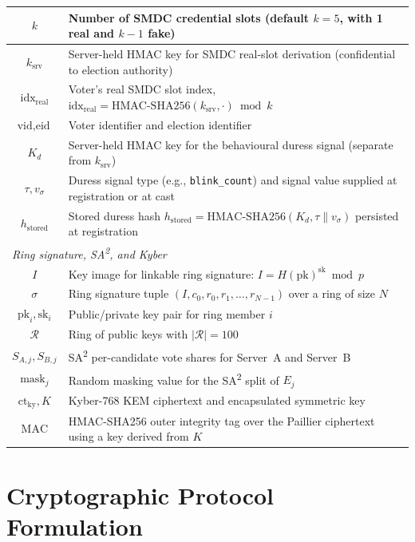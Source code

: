 {\begin{longtable}{|c|p{10cm}|}
\hline
$k$ & Number of SMDC credential slots (default $k=5$, with 1 real and $k-1$ fake) \\
\hline
$k_{\text{srv}}$ & Server-held HMAC key for SMDC real-slot derivation (confidential to election authority) \\
\hline
$\text{idx}_{\text{real}}$ & Voter's real SMDC slot index, $\text{idx}_{\text{real}} = \text{HMAC-SHA256}(k_{\text{srv}}, \cdot) \bmod k$ \\
\hline
$\text{vid}, \text{eid}$ & Voter identifier and election identifier \\
\hline
$K_d$ & Server-held HMAC key for the behavioural duress signal (separate from $k_{\text{srv}}$) \\
\hline
$\tau, v_{\sigma}$ & Duress signal type (e.g., \texttt{blink\_count}) and signal value supplied at registration or at cast \\
\hline
$h_{\text{stored}}$ & Stored duress hash $h_{\text{stored}} = \text{HMAC-SHA256}(K_d, \tau \| v_{\sigma})$ persisted at registration \\
\hline
\multicolumn{2}{|l|}{\textit{Ring signature, SA\textsuperscript{2}, and Kyber}} \\
\hline
$I$ & Key image for linkable ring signature: $I = H(\text{pk})^{\text{sk}} \bmod p$ \\
\hline
$\sigma$ & Ring signature tuple $(I, c_0, r_0, r_1, \ldots, r_{N-1})$ over a ring of size $N$ \\
\hline
$\text{pk}_i, \text{sk}_i$ & Public/private key pair for ring member $i$ \\
\hline
$\mathcal{R}$ & Ring of public keys with $|\mathcal{R}| = 100$ \\
\hline
$S_{A,j}, S_{B,j}$ & SA\textsuperscript{2} per-candidate vote shares for Server~A and Server~B \\
\hline
$\text{mask}_j$ & Random masking value for the SA\textsuperscript{2} split of $E_j$ \\
\hline
$\text{ct}_{\text{ky}}, K$ & Kyber-768 KEM ciphertext and encapsulated symmetric key \\
\hline
$\text{MAC}$ & HMAC-SHA256 outer integrity tag over the Paillier ciphertext using a key derived from $K$ \\
\hline
\end{longtable}
}

\section{Cryptographic Protocol Formulation}
\label{sec:crypto-formulation}

